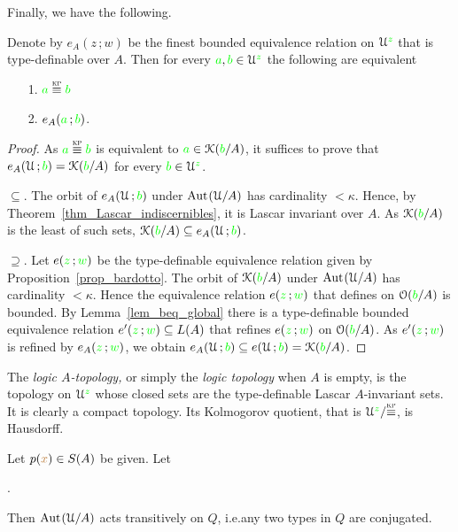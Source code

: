 Finally, we have the following.

\begin{theorem}\label{thm_Krupinski}
  Denote by $e_A(z\,;w)$ be the finest bounded equivalence relation on $\EuScript U^{\color{green} z}$ that is type-definable over $A$.
  Then for every ${\color{green} a}, {\color{green} b}\in\EuScript U^{\color{green} z}$ the following are equivalent
  \begin{itemize}
  \item[1.] ${\gr a}\equivKP{\gr b}$
  \item[2.] $e_A({\color{green} a}\,;{\color{green} b})$.
  \end{itemize} 
\end{theorem}
\begin{proof} 
  As  ${\gr a}\equivKP{\gr b}$ is equivalent to ${\color{green} a}\in\EuScript K({\color{green} b}/A)$, it suffices to prove that $e_A(\EuScript U\,;{\color{green} b})=\EuScript K({\color{green} b}/A)$ for every ${\color{green} b}\in\EuScript U^{\color{green} z}$. 
 
  $\subseteq$. The orbit of $e_A(\EuScript U\,;{\color{green} b})$ under ${\rm Aut\kern.15ex}(\EuScript U/A)$ has cardinality $<\kappa$.
  Hence, by Theorem~\ref{thm_Lascar_indiscernibles}, it is  Lascar invariant over $A$.
  As $\EuScript K({\color{green} b}/A)$ is the least of such sets, $\EuScript K({\color{green} b}/A)\subseteq e_A(\EuScript U\,;{\color{green} b})$.
  
  $\supseteq$. Let $e({\color{green} z}\,;{\color{green} w})$ be the type-definable equivalence relation given by Proposition~\ref{prop_bardotto}. 
  The orbit of $\EuScript K({\color{green} b}/A)$ under ${\rm Aut\kern.15ex}(\EuScript U/A)$ has cardinality $<\kappa$. 
  Hence the equivalence relation $e({\color{green} z}\,;{\color{green} w})$ that defines on $\EuScript O({\color{green} b}/A)$ is bounded. 
  By Lemma~\ref{lem_beq_global} there is a type-definable bounded equivalence relation $e'({\color{green} z}\,;{\color{green} w})\subseteq L(A)$ that refines $e({\color{green} z}\,;{\color{green} w})$ on $\EuScript O({\color{green} b}/A)$. 
  As $e'({\color{green} z}\,;{\color{green} w})$ is refined by $e_A({\color{green} z}\,;{\color{green} w})$, we obtain $e_A(\EuScript U\,;{\color{green} b})\subseteq e(\EuScript U\,;{\color{green} b})=\EuScript K({\color{green} b}/A)$.
\end{proof}

The \emph{logic $A$-topology,} or simply the \emph{logic topology\/} when $A$ is empty, is the topology on $\EuScript U^{\color{green} z}$ whose closed sets are the type-definable Lascar $A$-invariant sets.
It is clearly a compact topology.
Its Kolmogorov quotient, that is $\U^{\gr z}/{\equivKP}$, is Hausdorff.

\begin{proposition}\label{prop_trans_action_KP}
  Let $p({\color{brown} x})\in S(A)$ be given.
  Let 
  
  .
  
  Then ${\rm Aut\kern.15ex}(\EuScript U/A)$ acts transitively on $Q$, i.e.\@ any two types in $Q$ are conjugated.
\end{proposition}

